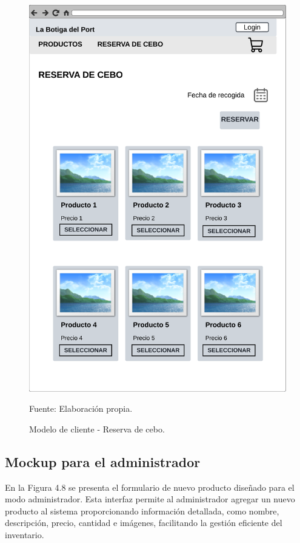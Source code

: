 \begin{figure}[H]
\begin{center}
\includegraphics[scale=0.5]{./Images/reserva_cebo.png}
\caption{Modelo de cliente - Reserva de cebo.} Fuente: Elaboración propia.

\label{fig:fig7}

\end{center}
\end{figure}

\subsection{Mockup para el administrador}\label{subsec4.2.3}

En la Figura 4.8 se presenta el formulario de nuevo producto diseñado para el modo administrador. Esta interfaz permite al administrador agregar un nuevo producto al sistema proporcionando información detallada, como nombre, descripción, precio, cantidad e imágenes, facilitando la gestión eficiente del inventario.



